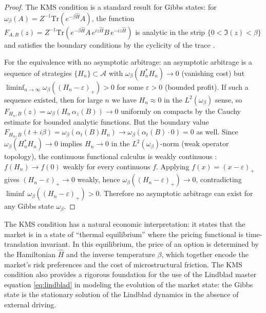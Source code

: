 \begin{proof}
The KMS condition is a standard result for Gibbs states: for
$\omega_\beta(A) = Z^{-1}\mathrm{Tr}(e^{-\beta\hat{H}}A)$, the function
$F_{A,B}(z) = Z^{-1}\mathrm{Tr}(e^{-\beta\hat{H}}A\,e^{iz\hat{H}}B\,e^{-iz\hat{H}})$
is analytic in the strip $\{0 < \Im(z) < \beta\}$ and satisfies the
boundary conditions by the cyclicity of the trace \citep{bratteli1981operator}.

For the equivalence with no asymptotic arbitrage: an asymptotic arbitrage
is a sequence of strategies $\{H_n\} \subset \mathcal{A}$ with
$\omega_\beta(H_n^*H_n) \to 0$ (vanishing cost) but
$\liminf_{n\to\infty} \omega_\beta((H_n - \varepsilon)_+) > 0$
for some $\varepsilon > 0$ (bounded profit). If such a sequence existed,
then for large $n$ we have $H_n \approx 0$ in the $L^2(\omega_\beta)$
sense, so $F_{H_n,B}(z) = \omega_\beta(H_n\,\alpha_z(B)) \to 0$
uniformly on compacts by the Cauchy estimate for bounded analytic functions.
But the boundary value $F_{H_n,B}(t+i\beta) = \omega_\beta(\alpha_t(B)H_n)
\to \omega_\beta(\alpha_t(B) \cdot 0) = 0$ as well. Since $\omega_\beta(H_n^*H_n)\to 0$
implies $H_n \to 0$ in the $L^2(\omega_\beta)$-norm (weak operator topology),
the continuous functional calculus is weakly continuous
\citep{bratteli1981operator}: $f(H_n)\to f(0)$ weakly for every continuous $f$.
Applying $f(x)=(x-\varepsilon)_+$ gives $(H_n-\varepsilon)_+ \to 0$ weakly,
hence $\omega_\beta((H_n-\varepsilon)_+) \to 0$, contradicting
$\liminf\,\omega_\beta((H_n-\varepsilon)_+) > 0$. Therefore no asymptotic
arbitrage can exist for any Gibbs state $\omega_\beta$.
\end{proof}

\begin{remark}\label{rem:kms-econ}
The KMS condition has a natural economic interpretation: it states that the market
is in a state of ``thermal equilibrium'' where the pricing functional is
time-translation invariant. In this equilibrium, the price of an option is
determined by the Hamiltonian $\hat{H}$ and the inverse temperature $\beta$, which
together encode the market's risk preferences and the cost of microstructural
friction. The KMS condition also provides a rigorous foundation for the use of the
Lindblad master equation \eqref{eq:lindblad} in modeling the evolution of the
market state: the Gibbs state is the stationary solution of the Lindblad dynamics
in the absence of external driving.
\end{remark}

